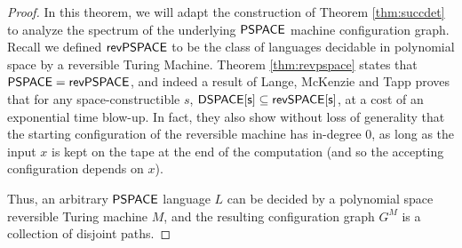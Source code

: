 \documentclass[11pt]{article}
\theoremstyle{definition}
\theoremstyle{remark}
\newcommand\PSPACE{{\sf{PSPACE}}}
\newcommand\revPSPACE{{\sf{revPSPACE}}}
\begin{document}
\begin{proof}
	In this theorem, we will adapt the construction of Theorem \ref{thm:succdet} to analyze the spectrum of the underlying $\PSPACE$ machine configuration graph.  
	 Recall we defined $\revPSPACE$ to be the class of languages decidable in polynomial space by a reversible Turing Machine.  Theorem \ref{thm:revpspace} states that $\PSPACE=\revPSPACE$, and indeed a result of Lange, McKenzie and Tapp \cite{lange00} proves that for any space-constructible $s$, ${\sf{DSPACE}[s]}\subseteq{\sf{revSPACE}[s]}$, at a cost of an exponential time blow-up.  In fact, they also show without loss of generality that the starting configuration of the reversible machine has in-degree $0$, as long as the input $x$ is kept on the tape at the end of the computation (and so the accepting configuration depends on $x$).
	
	Thus, an arbitrary $\PSPACE$ language $L$ can be decided by a polynomial space reversible Turing machine $M$, and the resulting configuration graph $G^M$ is a collection of disjoint paths. 
		

\end{proof}
\end{document}
